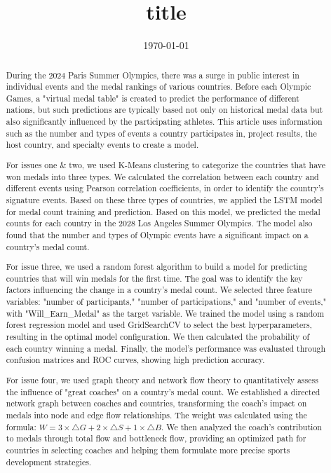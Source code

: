 \documentclass{mcmthesis}
\title{{\bf title}}
\date{\today}
\begin{document}
\begin{abstract}

    During the 2024 Paris Summer Olympics, there was a surge in public interest in individual events and the medal rankings of various countries. Before each Olympic Games, a "virtual medal table" is created to predict the performance of different nations, but such predictions are typically based not only on historical medal data but also significantly influenced by the participating athletes. This article uses information such as the number and types of events a country participates in, project results, the host country, and specialty events to create a model.

    For issues one \& two, we used K-Means clustering to categorize the countries that have won medals into three types. We calculated the correlation between each country and different events using Pearson correlation coefficients, in order to identify the country's signature events. Based on these three types of countries, we applied the LSTM model for medal count training and prediction. Based on this model, we predicted the medal counts for each country in the 2028 Los Angeles Summer Olympics. The model also found that the number and types of Olympic events have a significant impact on a country's medal count.

    For issue three, we used a random forest algorithm to build a model for predicting countries that will win medals for the first time. The goal was to identify the key factors influencing the change in a country's medal count. We selected three feature variables: "number of participants," "number of participations," and "number of events," with "Will\_Earn\_Medal" as the target variable. We trained the model using a random forest regression model and used GridSearchCV to select the best hyperparameters, resulting in the optimal model configuration. We then calculated the probability of each country winning a medal. Finally, the model's performance was evaluated through confusion matrices and ROC curves, showing high prediction accuracy.

    For issue four, we used graph theory and network flow theory to quantitatively assess the influence of "great coaches" on a country's medal count. We established a directed network graph between coaches and countries, transforming the coach's impact on medals into node and edge flow relationships. The weight was calculated using the formula: $W=3\times \triangle G+2\times \triangle S+1\times \triangle B$. We then analyzed the coach's contribution to medals through total flow and bottleneck flow, providing an optimized path for countries in selecting coaches and helping them formulate more precise sports development strategies.
   

\end{abstract}
\end{document}
